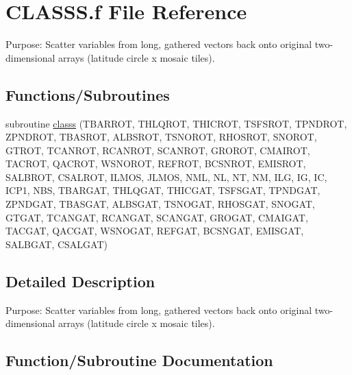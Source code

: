 \hypertarget{CLASSS_8f}{}\section{C\+L\+A\+S\+S\+S.\+f File Reference}
\label{CLASSS_8f}


Purpose\+: Scatter variables from long, gathered vectors back onto original two-\/dimensional arrays (latitude circle x mosaic tiles).  


\subsection*{Functions/\+Subroutines}
\begin{DoxyCompactItemize}
\item 
subroutine \hyperlink{CLASSS_8f_a3814fc276d21467a86f856186dd5d938}{classs} (T\+B\+A\+R\+R\+O\+T, T\+H\+L\+Q\+R\+O\+T, T\+H\+I\+C\+R\+O\+T, T\+S\+F\+S\+R\+O\+T, T\+P\+N\+D\+R\+O\+T, Z\+P\+N\+D\+R\+O\+T, T\+B\+A\+S\+R\+O\+T, A\+L\+B\+S\+R\+O\+T, T\+S\+N\+O\+R\+O\+T, R\+H\+O\+S\+R\+O\+T, S\+N\+O\+R\+O\+T, G\+T\+R\+O\+T, T\+C\+A\+N\+R\+O\+T, R\+C\+A\+N\+R\+O\+T, S\+C\+A\+N\+R\+O\+T, G\+R\+O\+R\+O\+T, C\+M\+A\+I\+R\+O\+T, T\+A\+C\+R\+O\+T, Q\+A\+C\+R\+O\+T, W\+S\+N\+O\+R\+O\+T, R\+E\+F\+R\+O\+T, B\+C\+S\+N\+R\+O\+T, E\+M\+I\+S\+R\+O\+T, S\+A\+L\+B\+R\+O\+T, C\+S\+A\+L\+R\+O\+T, I\+L\+M\+O\+S, J\+L\+M\+O\+S, N\+M\+L, N\+L, N\+T, N\+M, I\+L\+G, I\+G, I\+C, I\+C\+P1, N\+B\+S, T\+B\+A\+R\+G\+A\+T, T\+H\+L\+Q\+G\+A\+T, T\+H\+I\+C\+G\+A\+T, T\+S\+F\+S\+G\+A\+T, T\+P\+N\+D\+G\+A\+T, Z\+P\+N\+D\+G\+A\+T, T\+B\+A\+S\+G\+A\+T, A\+L\+B\+S\+G\+A\+T, T\+S\+N\+O\+G\+A\+T, R\+H\+O\+S\+G\+A\+T, S\+N\+O\+G\+A\+T, G\+T\+G\+A\+T, T\+C\+A\+N\+G\+A\+T, R\+C\+A\+N\+G\+A\+T, S\+C\+A\+N\+G\+A\+T, G\+R\+O\+G\+A\+T, C\+M\+A\+I\+G\+A\+T, T\+A\+C\+G\+A\+T, Q\+A\+C\+G\+A\+T, W\+S\+N\+O\+G\+A\+T, R\+E\+F\+G\+A\+T, B\+C\+S\+N\+G\+A\+T, E\+M\+I\+S\+G\+A\+T, S\+A\+L\+B\+G\+A\+T, C\+S\+A\+L\+G\+A\+T)
\end{DoxyCompactItemize}


\subsection{Detailed Description}
Purpose\+: Scatter variables from long, gathered vectors back onto original two-\/dimensional arrays (latitude circle x mosaic tiles). 



\subsection{Function/\+Subroutine Documentation}
\hypertarget{CLASSS_8f_a3814fc276d21467a86f856186dd5d938}{}
